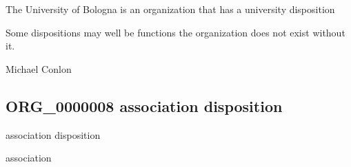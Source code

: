 \documentclass[letterpaper,10pt,english]{sphinxmanual}
\begin{document}
\begin{sphinxShadowBox}

\sphinxAtStartPar
The University of Bologna is an organization that has a university disposition
\end{sphinxShadowBox}

\begin{sphinxShadowBox}

\sphinxAtStartPar
Some dispositions may well be functions \textendash{} the organization does not exist without it.
\end{sphinxShadowBox}

\begin{sphinxShadowBox}

\sphinxAtStartPar
{}
\end{sphinxShadowBox}

\begin{sphinxShadowBox}

\sphinxAtStartPar
Michael Conlon 
\end{sphinxShadowBox}
\begin{quote}

\ignorespaces \end{quote}


\subsection{ORG\_0000008 \sphinxhyphen{} association disposition}
\label{\detokenize{doc-ORG_0000008:org-0000008-association-disposition}}\label{\detokenize{doc-ORG_0000008:index-0}}\label{\detokenize{doc-ORG_0000008::doc}}
\begin{sphinxShadowBox}

\sphinxAtStartPar
association disposition
\end{sphinxShadowBox}

\begin{sphinxShadowBox}

\sphinxAtStartPar
association
\end{sphinxShadowBox}
\end{document}
